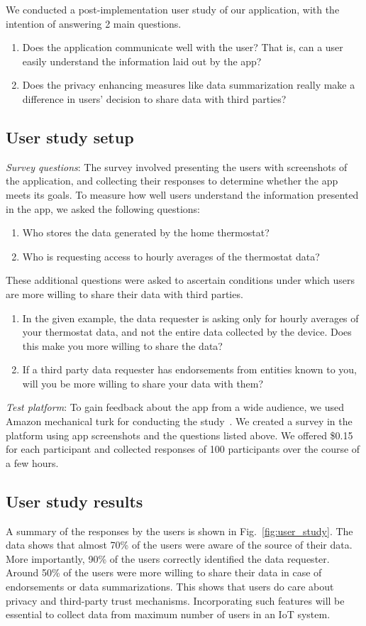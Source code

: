 We conducted a post-implementation user study of our application, with the intention of answering 2 main questions.
\begin{enumerate}
	\item Does the application communicate well with the user? That is, can a user easily understand the information laid out by the app?
	\item Does the privacy enhancing measures like data summarization really make a difference in users' decision to share data with third parties?
\end{enumerate}

\subsection{User study setup}

\textit{Survey questions}: The survey involved presenting the users with screenshots of the application, and collecting their responses to determine whether the app meets its goals. To measure how well users understand the information presented in the app, we asked the following questions:
\begin{enumerate}
	\item Who stores the data generated by the home thermostat?
	\item Who is requesting access to hourly averages of the thermostat data?
\end{enumerate}

These additional questions were asked to ascertain conditions under which users are more willing to share their data with third parties.
\begin{enumerate}
	\item In the given example, the data requester is asking only for hourly averages of your thermostat data, and not the entire data collected by the device. Does this make you more willing to share the data?
	\item If a third party data requester has endorsements from entities known to you, will you be more willing to share your data with them?
\end{enumerate}

\textit{Test platform}: To gain feedback about the app from a wide audience, we used Amazon mechanical turk for conducting the study~\cite{mturk}. We created a survey in the platform using app screenshots and the questions listed above. We offered \$0.15 for each participant and collected responses of 100 participants over the course of a few hours.

\subsection{User study results}
A summary of the responses by the users is shown in Fig.~\ref{fig:user_study}. The data shows that almost 70\% of the users were aware of the source of their data. More importantly, 90\% of the users correctly identified the data requester. Around 50\% of the users were more willing to share their data in case of endorsements or data summarizations. This shows that users do care about privacy and third-party trust mechanisms. Incorporating such features will be essential to collect data from maximum number of users in an IoT system.